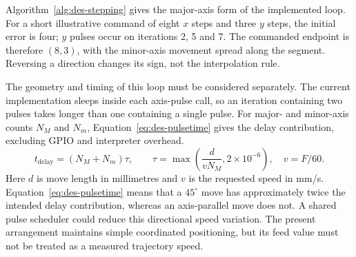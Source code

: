 Algorithm~\ref{alg:des-stepping} gives the major-axis form of the implemented loop. For a short illustrative command of eight $x$ steps and three $y$ steps, the initial error is four; $y$ pulses occur on iterations 2, 5 and 7. The commanded endpoint is therefore $(8,3)$, with the minor-axis movement spread along the segment. Reversing a direction changes its sign, not the interpolation rule.
\begin{designalgorithm}
\caption{Coordinated axis stepping with interruption checks}
\label{alg:des-stepping}
\begin{designpseudo}
\end{designpseudo}
\end{designalgorithm}

The geometry and timing of this loop must be considered separately. The current implementation sleeps inside each axis-pulse call, so an iteration containing two pulses takes longer than one containing a single pulse. For major- and minor-axis counts $N_M$ and $N_m$, Equation~\ref{eq:des-pulsetime} gives the delay contribution, excluding GPIO and interpreter overhead.
\begin{equation}
t_{\mathrm{delay}}=(N_M+N_m)\tau,\qquad
\tau=\max\left(\frac{d}{vN_M},2\times10^{-6}\right),\quad v=F/60.
\label{eq:des-pulsetime}
\end{equation}
Here $d$ is move length in millimetres and $v$ is the requested speed in mm/s. Equation~\ref{eq:des-pulsetime} means that a $45^\circ$ move has approximately twice the intended delay contribution, whereas an axis-parallel move does not. A shared pulse scheduler could reduce this directional speed variation. The present arrangement maintains simple coordinated positioning, but its feed value must not be treated as a measured trajectory speed.

